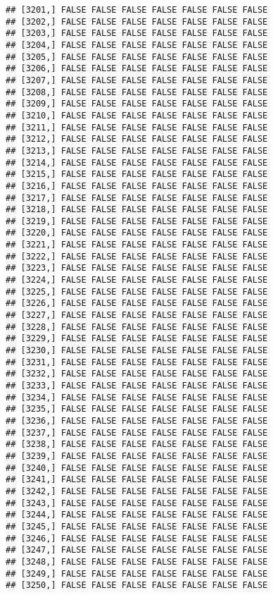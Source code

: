 \documentclass[
]{article}
\begin{document}
\begin{verbatim}
## [3201,] FALSE FALSE FALSE FALSE FALSE FALSE FALSE
## [3202,] FALSE FALSE FALSE FALSE FALSE FALSE FALSE
## [3203,] FALSE FALSE FALSE FALSE FALSE FALSE FALSE
## [3204,] FALSE FALSE FALSE FALSE FALSE FALSE FALSE
## [3205,] FALSE FALSE FALSE FALSE FALSE FALSE FALSE
## [3206,] FALSE FALSE FALSE FALSE FALSE FALSE FALSE
## [3207,] FALSE FALSE FALSE FALSE FALSE FALSE FALSE
## [3208,] FALSE FALSE FALSE FALSE FALSE FALSE FALSE
## [3209,] FALSE FALSE FALSE FALSE FALSE FALSE FALSE
## [3210,] FALSE FALSE FALSE FALSE FALSE FALSE FALSE
## [3211,] FALSE FALSE FALSE FALSE FALSE FALSE FALSE
## [3212,] FALSE FALSE FALSE FALSE FALSE FALSE FALSE
## [3213,] FALSE FALSE FALSE FALSE FALSE FALSE FALSE
## [3214,] FALSE FALSE FALSE FALSE FALSE FALSE FALSE
## [3215,] FALSE FALSE FALSE FALSE FALSE FALSE FALSE
## [3216,] FALSE FALSE FALSE FALSE FALSE FALSE FALSE
## [3217,] FALSE FALSE FALSE FALSE FALSE FALSE FALSE
## [3218,] FALSE FALSE FALSE FALSE FALSE FALSE FALSE
## [3219,] FALSE FALSE FALSE FALSE FALSE FALSE FALSE
## [3220,] FALSE FALSE FALSE FALSE FALSE FALSE FALSE
## [3221,] FALSE FALSE FALSE FALSE FALSE FALSE FALSE
## [3222,] FALSE FALSE FALSE FALSE FALSE FALSE FALSE
## [3223,] FALSE FALSE FALSE FALSE FALSE FALSE FALSE
## [3224,] FALSE FALSE FALSE FALSE FALSE FALSE FALSE
## [3225,] FALSE FALSE FALSE FALSE FALSE FALSE FALSE
## [3226,] FALSE FALSE FALSE FALSE FALSE FALSE FALSE
## [3227,] FALSE FALSE FALSE FALSE FALSE FALSE FALSE
## [3228,] FALSE FALSE FALSE FALSE FALSE FALSE FALSE
## [3229,] FALSE FALSE FALSE FALSE FALSE FALSE FALSE
## [3230,] FALSE FALSE FALSE FALSE FALSE FALSE FALSE
## [3231,] FALSE FALSE FALSE FALSE FALSE FALSE FALSE
## [3232,] FALSE FALSE FALSE FALSE FALSE FALSE FALSE
## [3233,] FALSE FALSE FALSE FALSE FALSE FALSE FALSE
## [3234,] FALSE FALSE FALSE FALSE FALSE FALSE FALSE
## [3235,] FALSE FALSE FALSE FALSE FALSE FALSE FALSE
## [3236,] FALSE FALSE FALSE FALSE FALSE FALSE FALSE
## [3237,] FALSE FALSE FALSE FALSE FALSE FALSE FALSE
## [3238,] FALSE FALSE FALSE FALSE FALSE FALSE FALSE
## [3239,] FALSE FALSE FALSE FALSE FALSE FALSE FALSE
## [3240,] FALSE FALSE FALSE FALSE FALSE FALSE FALSE
## [3241,] FALSE FALSE FALSE FALSE FALSE FALSE FALSE
## [3242,] FALSE FALSE FALSE FALSE FALSE FALSE FALSE
## [3243,] FALSE FALSE FALSE FALSE FALSE FALSE FALSE
## [3244,] FALSE FALSE FALSE FALSE FALSE FALSE FALSE
## [3245,] FALSE FALSE FALSE FALSE FALSE FALSE FALSE
## [3246,] FALSE FALSE FALSE FALSE FALSE FALSE FALSE
## [3247,] FALSE FALSE FALSE FALSE FALSE FALSE FALSE
## [3248,] FALSE FALSE FALSE FALSE FALSE FALSE FALSE
## [3249,] FALSE FALSE FALSE FALSE FALSE FALSE FALSE
## [3250,] FALSE FALSE FALSE FALSE FALSE FALSE FALSE

\end{verbatim}
\end{document}

